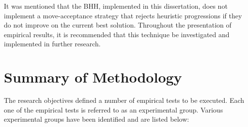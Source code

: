 It was mentioned that the \acs{BHH}, implemented in this dissertation, does not implement a move-acceptance strategy that rejects heuristic progressions if they do not improve on the current best solution. Throughout the presentation of empirical results, it is recommended that this technique be investigated and implemented in further research.


\section{Summary of Methodology}
\label{sec:conclusion:methodology}

The research objectives defined a number of empirical tests to be executed. Each one of the empirical tests is referred to as an experimental group. Various experimental groups have been identified and are listed below:


